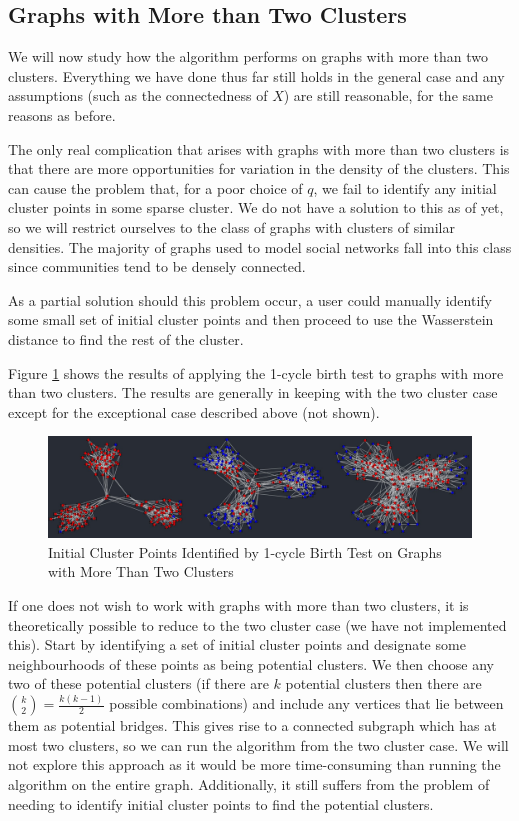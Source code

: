 \documentclass[12pt,a4paper]{amsart}
\numberwithin{equation}{section}
\theoremstyle{plain}
\theoremstyle{definition}
\begin{document}
\subsection{Graphs with More than Two Clusters}

We will now study how the algorithm performs on graphs with more than two clusters. Everything we have done thus far still holds in the general case and any assumptions (such as the connectedness of $X$) are still reasonable, for the same reasons as before.

The only real complication that arises with graphs with more than two clusters is that there are more opportunities for variation in the density of the clusters. This can cause the problem that, for a poor choice of $q$, we fail to identify any initial cluster points in some sparse cluster. We do not have a solution to this as of yet, so we will restrict ourselves to the class of graphs with clusters of similar densities. The majority of graphs used to model social networks fall into this class since communities tend to be densely connected.

As a partial solution should this problem occur, a user could manually identify some small set of initial cluster points and then proceed to use the Wasserstein distance to find the rest of the cluster.

Figure \ref{multiclusters} shows the results of applying the 1-cycle birth test to graphs with more than two clusters. The results are generally in keeping with the two cluster case except for the exceptional case described above (not shown).

\begin{figure}[h]
	\centering	
	\includegraphics[scale=0.45]{Multiclusters.jpg}
	\caption{Initial Cluster Points Identified by 1-cycle Birth Test on Graphs with More Than Two Clusters}
	\label{multiclusters}
\end{figure}

If one does not wish to work with graphs with more than two clusters, it is theoretically possible to reduce to the two cluster case (we have not implemented this). Start by identifying a set of initial cluster points and designate some neighbourhoods of these points as being potential clusters. We then choose any two of these potential clusters (if there are $k$ potential clusters then there are $\binom{k}{2} = \frac{k(k-1)}{2}$ possible combinations) and include any vertices that lie between them as potential bridges. This gives rise to a connected subgraph which has at most two clusters, so we can run the algorithm from the two cluster case. We will not explore this approach as it would be more time-consuming than running the algorithm on the entire graph. Additionally, it still suffers from the problem of needing to identify initial cluster points to find the potential clusters.
\end{document}
